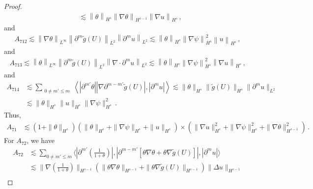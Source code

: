 \documentclass[reqno,11pt]{amsart}
\numberwithin{equation}{section}
\def\p{\partial}
\begin{document}
\begin{proof}
\begin{equation*}
\begin{aligned}
&\lesssim \left\| \theta \right\|_{H^s} \left\| \nabla \theta \right\|_{H^{s-1}} \left\|\nabla u \right\|_{H^s} \,,
\end{aligned}
\end{equation*}
and
\begin{equation*}
\begin{aligned}
A_{712} \lesssim\left\| \nabla \theta \right\|_{L^\infty} \left\| \partial^m \tilde{g}(U) \right\|_{L^2} \left\| \partial^m u \right\|_{L^2} \lesssim \left\| \theta \right\|_{H^s} \left\| \nabla \psi \right\|_{H^s}^2 \left\| u \right\|_{H^s} \,,
\end{aligned}
\end{equation*}
and
\begin{equation*}
\begin{aligned}
A_{713} \lesssim\left\| \theta \right\|_{L^\infty} \left\| \partial^m \tilde{g}(U) \right\|_{L^2} \left\| \nabla \cdot \partial^m u \right\|_{L^2} \lesssim \left\| \theta \right\|_{H^s} \left\| \nabla \psi \right\|_{H^s}^2 \left\| \nabla u \right\|_{H^s} \,,
\end{aligned}
\end{equation*}
and
\begin{equation*}
\begin{aligned}
A_{714}& \lesssim\sum_{\substack{0 \neq m' \leq m}} \left\langle \left| \partial^{m'} \theta \right| \left| \nabla \partial^{m - m'} \tilde{g}(U) \right|, \left| \partial^m u \right| \right\rangle \lesssim \| \theta \|_{H^s} \|\tilde{g}(U)\|_{H^s}\|\p^m u\|_{L^2} \\
& \lesssim \| \theta \|_{H^s} \| u \|_{H^s} \| \nabla \psi\|^2_{H^s} \,.
\end{aligned}
\end{equation*}
Thus,
\begin{equation*}
\begin{aligned}
A_{71}& \lesssim(1+\|\theta\|_{H^s})(\|\theta\|_{H^s}+\|\nabla \psi\|_{H^s}+\|u\|_{H^s})
\times(\|\nabla u\|^2_{H^s}+\|\nabla \psi\|^2_{H^s}+\|\nabla \theta\|^2_{H^{s - 1}})
\,.
\end{aligned}
\end{equation*}
For $A_{72}$, we have
\begin{equation*}
\begin{aligned}
A_{72}& \lesssim\sum_{0 \neq m' \leq m}\langle|\partial^{m'}(\frac{1}{1 + \theta})|,|\partial^{m - m'}[\theta\nabla \theta+\theta\nabla\tilde{g}(U)]|,|\partial^m u|\rangle\\&
\lesssim\|\nabla(\frac{1}{1 + \theta})\|_{H^{s - 1}}(\|\theta\nabla \theta\|_{H^{s - 1}}+\|\theta\nabla \tilde{g}(U)\|_{H^{s - 1}})\|\Delta u\|_{H^{s - 1}}\\&

\end{aligned}
\end{equation*}
\end{proof}
\end{document}
